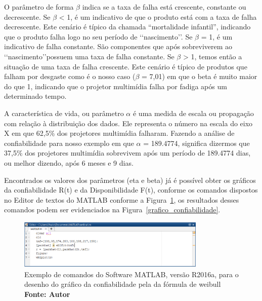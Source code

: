 O parâmetro de forma $ \beta $ indica se a taxa de falha está crescente, constante ou decrescente. Se $ \beta $ < 1, é um indicativo de que o produto está com a taxa de falha decrescente. Este cenário é típico da chamada “mortalidade infantil”, indicando que o produto falha logo no seu período de \lq\lq nascimento\rq\rq. Se $ \beta $ = 1, é um indicativo de falha constante. São componentes que após sobreviverem ao \lq\lq nascimento\rq\rq possuem uma taxa de falha constante. Se $ \beta $ > 1, temos então a situação de uma taxa de falha crescente. Este cenário é típico de produtos que falham por desgaste como é o nosso caso ($ \beta $ = 7,01) em que o beta é muito maior do que 1, indicando que o projetor multimídia falha por fadiga após um determinado tempo.

A característica de vida, ou parâmetro $ \alpha $ é uma medida de escala ou propagação com relação à distribuição dos dados. Ele representa o número na escala do eixo X em que 62,5\% dos projetores multimídia falharam. Fazendo a análise de confiabilidade para nosso exemplo em que $ \alpha $ = 189.4774, significa dizermos que 37,5\% dos projetores multimídia sobrevivem após um período de 189.4774 dias, ou melhor dizendo, após 6 meses e 9 dias.

Encontrados os valores dos parâmetros (eta e beta) já é possível obter os gráficos da confiabilidade R(t) e da Disponibilidade F(t), conforme os comandos dispostos no Editor de textos do MATLAB conforme a Figura~\ref{plotweibull}, os resultados desses comandos podem ser evidenciados na Figura~\ref{grafico_confiabilidade}. 

\graphicspath{{figuras/}}
\begin{figure}[H]
\centering
\includegraphics[width=0.8\textwidth]{plotweibull.eps}
\caption{Exemplo de comandos do Software MATLAB, versão R2016a, para o desenho do gráfico da confiabilidade pela da fórmula de weibull \textbf{Fonte: Autor}}
\label{plotweibull}
\end{figure}

